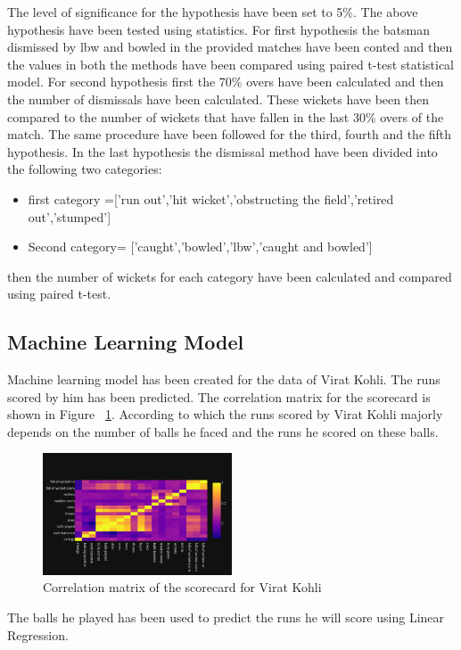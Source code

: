 \documentclass[fleqn,10pt]{wlscirep}
\begin{document}
The level of significance for the hypothesis have been set to 5\%.
The above hypothesis have been tested using statistics.\newline
For first hypothesis the batsman dismissed by lbw and bowled in the provided matches have been conted and 
then the values in both the methods have been compared using paired t-test statistical model.\newline
For second hypothesis first the 70\% overs have been calculated and then the number of dismissals have been calculated.
These wickets have been then compared to the number of wickets that have fallen in the last 30\% overs of the match.\newline
The same procedure have been followed for the third, fourth and the fifth hypothesis.\newline
In the last hypothesis the dismissal method have been divided into the following two categories:
    \begin{itemize}
        \item first category =['run out','hit wicket','obstructing the field','retired out','stumped']
        \item Second category= ['caught','bowled','lbw','caught and bowled']
    \end{itemize}
then the number of wickets for each category have been calculated and compared using paired t-test. 
\subsection{Machine Learning Model}
Machine learning model has been created for the data of Virat Kohli. The runs scored by him has been predicted.
The correlation matrix for the scorecard is shown in Figure ~\ref{fig:twenty}. According to which the runs scored by Virat Kohli
majorly depends on the number of balls he faced and the runs he scored on these balls.
\begin{figure}[!htb]
    \centering
    \includegraphics[width=0.5\textwidth]{correlation.png}
    \caption{Correlation matrix of the scorecard for Virat Kohli}
    \label{fig:twenty}
  \end{figure}
The balls he played has been used to predict the runs he will score using Linear Regression.
\end{document}
